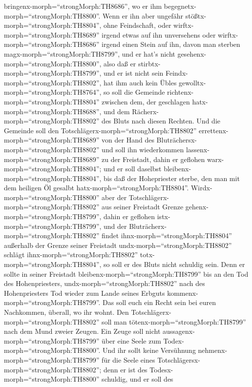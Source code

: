 bringenx-morph=``strongMorph:TH8686'', wo er ihm
begegnetx-morph=``strongMorph:TH8800''.  Wenn er ihn aber
ungefähr stößtx-morph=``strongMorph:TH8804'', ohne Feindschaft, oder
wirftx-morph=``strongMorph:TH8689'' irgend etwas auf ihn unversehens
 oder wirftx-morph=``strongMorph:TH8686'' irgend einen
Stein auf ihn, davon man sterben magx-morph=``strongMorph:TH8799'', und
er hat's nicht gesehenx-morph=``strongMorph:TH8800'', also daß er
stirbtx-morph=``strongMorph:TH8799'', und er ist nicht sein
Feindx-morph=``strongMorph:TH8802'', hat ihm auch kein Übles
gewolltx-morph=``strongMorph:TH8764'',  so soll die
Gemeinde richtenx-morph=``strongMorph:TH8804'' zwischen dem, der
geschlagen hatx-morph=``strongMorph:TH8688'', und dem
Rächerx-morph=``strongMorph:TH8802'' des Bluts nach diesen Rechten.
 Und die Gemeinde soll den
Totschlägerx-morph=``strongMorph:TH8802''
errettenx-morph=``strongMorph:TH8689'' von der Hand des
Bluträchersx-morph=``strongMorph:TH8802'' und soll ihn wiederkommen
lassenx-morph=``strongMorph:TH8689'' zu der Freistadt, dahin er geflohen
warx-morph=``strongMorph:TH8804''; und er soll daselbst
bleibenx-morph=``strongMorph:TH8804'', bis daß der Hohepriester sterbe,
den man mit dem heiligen Öl gesalbt hatx-morph=``strongMorph:TH8804''.
 Wirdx-morph=``strongMorph:TH8800'' aber der
Totschlägerx-morph=``strongMorph:TH8802'' aus seiner Freistadt Grenze
gehenx-morph=``strongMorph:TH8799'', dahin er geflohen
istx-morph=``strongMorph:TH8799'',  und der
Bluträcherx-morph=``strongMorph:TH8802'' findet
ihnx-morph=``strongMorph:TH8804'' außerhalb der Grenze seiner Freistadt
undx-morph=``strongMorph:TH8802'' schlägt
ihnx-morph=``strongMorph:TH8802'' totx-morph=``strongMorph:TH8804'', so
soll er des Bluts nicht schuldig sein.  Denn er sollte in
seiner Freistadt bleibenx-morph=``strongMorph:TH8799'' bis an den Tod
des Hohenpriesters, undx-morph=``strongMorph:TH8802'' nach des
Hohenpriesters Tod wieder zum Lande seines Erbguts
kommenx-morph=``strongMorph:TH8799''.  Das soll euch ein
Recht sein bei euren Nachkommen, überall, wo ihr wohnt. 
Den Totschlägerx-morph=``strongMorph:TH8802'' soll man
tötenx-morph=``strongMorph:TH8799'' nach dem Mund zweier Zeugen. Ein
Zeuge soll nicht aussagenx-morph=``strongMorph:TH8799'' über eine Seele
zum Todex-morph=``strongMorph:TH8800''.  Und ihr sollt
keine Versühnung nehmenx-morph=``strongMorph:TH8799'' für die Seele
eines Totschlägersx-morph=``strongMorph:TH8802''; denn er ist des
Todesx-morph=``strongMorph:TH8800'' schuldig, und er soll des
